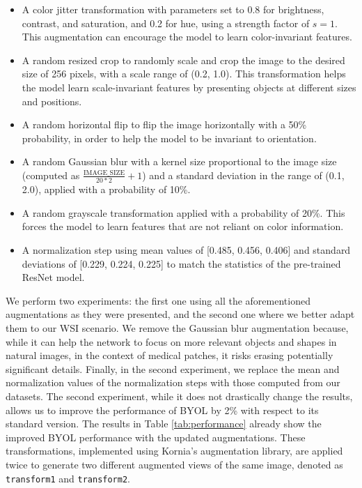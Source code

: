 \documentclass[peerreview]{IEEEtran}
\begin{document}
\begin{itemize}
\begin{itemize}
    \item A color jitter transformation with parameters set to 0.8 for brightness, contrast, and saturation, and 0.2 for hue, using a strength factor of $s = 1$. This augmentation can encourage the model to learn color-invariant features.
    \item A random resized crop to randomly scale and crop the image to the desired size of 256 pixels, with a scale range of (0.2, 1.0). This transformation helps the model learn scale-invariant features by presenting objects at different sizes and positions.
    \item A random horizontal flip to flip the image horizontally with a 50\% probability, in order to help the model to be invariant to orientation.
    \item A random Gaussian blur with a kernel size proportional to the image size (computed as $\frac{\text{IMAGE\_SIZE}}{20*2}+ 1$) and a standard deviation in the range of (0.1, 2.0), applied with a probability of 10\%. 
    \item A random grayscale transformation applied with a probability of 20\%. This forces the model to learn features that are not reliant on color information.
    \item A normalization step using mean values of [0.485, 0.456, 0.406] and standard deviations of [0.229, 0.224, 0.225] to match the statistics of the pre-trained ResNet model.
\end{itemize}
We perform two experiments: the first one using all the aforementioned augmentations as they were presented, and the second one where we better adapt them to our WSI scenario. We remove the Gaussian blur augmentation because, while it can help the network to focus on more relevant objects and shapes in natural images, in the context of medical patches, it risks erasing potentially significant details. Finally, in the second experiment, we replace the mean and normalization values of the normalization steps with those computed from our datasets. The second experiment, while it does not drastically change the results, allows us to improve the performance of BYOL by 2\% with respect to its standard version. The results in Table \ref{tab:performance} already show the improved BYOL performance with the updated augmentations. These transformations, implemented using Kornia's augmentation library, are applied twice to generate two different augmented views of the same image, denoted as \texttt{transform1} and \texttt{transform2}. 


\end{itemize}
\end{document}
